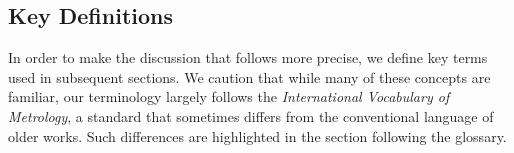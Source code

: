 \subsection{Key Definitions}

In order to make the discussion that follows more precise, we define key terms used in subsequent sections.
We caution that while many of these concepts are familiar, our terminology largely follows the {\it International Vocabulary of Metrology}, a standard that sometimes differs from the conventional language of older works\cite{JCGM:GUM2008,JCGM:VIM2012}.
Such differences are highlighted in the section following the glossary.




